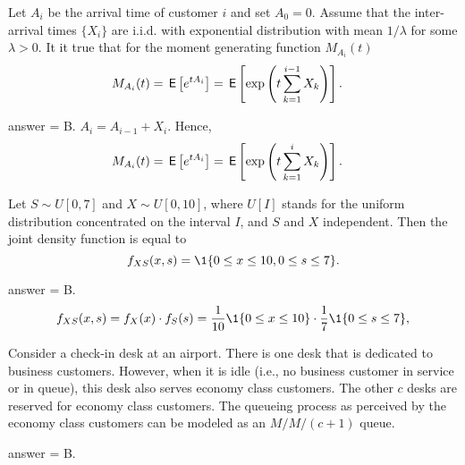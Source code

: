 \begin{exercise}[201902]
 Let $A_i$ be the arrival time of customer $i$ and set $A_0=0$.
    Assume that the inter-arrival times $\{X_i\}$ are i.i.d.  with
    exponential distribution with mean $1/\lambda$ for some
    $\lambda>0$. It it true that  for the  moment generating function $M_{A_i}(t)$
\begin{align*}
  M_{A_i}(t) &= \,\mathsf{E}\left[e^{t A_i}\right] = \,\mathsf{E}\left[\exp\left(t\sum_{k=1}^{i-1} X_k\right)\right].
\end{align*}

\begin{solution}
answer = B. $A_i = A_{i-1} + X_i$. Hence, 
\begin{align*}
  M_{A_i}(t) &= \,\mathsf{E}\left[e^{t A_i}\right] = \,\mathsf{E}\left[\exp\left(t\sum_{k=1}^{i} X_k\right)\right].
\end{align*}
\end{solution}
\end{exercise}

\begin{exercise}[201902]
  Let $S\sim U[0,7]$ and $X\sim U[0,10]$, where $U[I]$ stands for the
  uniform distribution concentrated on the interval $I$, and $S$ and $X$ independent. Then the joint density function is equal to 
\begin{equation*}
  f_{X S}(x,s) = \1{0\leq x \leq 10, 0\leq s \leq 7}.
\end{equation*}
\begin{solution}
answer = B. %
\begin{equation*}
  f_{X S}(x, s) = f_X(x) \cdot f_S(s) = \frac{1}{10} \1{0\leq x \leq 10}\cdot \frac 17 \1{0\leq s \leq 7},
\end{equation*}

\end{solution}
\end{exercise}

\begin{exercise}[201902]
Consider a check-in desk at an airport. There is one desk that is dedicated to  business customers. However, when it is idle (i.e., no business customer in service or in queue), this desk also serves economy class customers. The other $c$ desks are reserved for economy class customers. The queueing process as perceived by the economy class customers can be modeled as an $M/M/(c+1)$ queue. 
\begin{solution}
answer = B. 
\end{solution}
\end{exercise}


